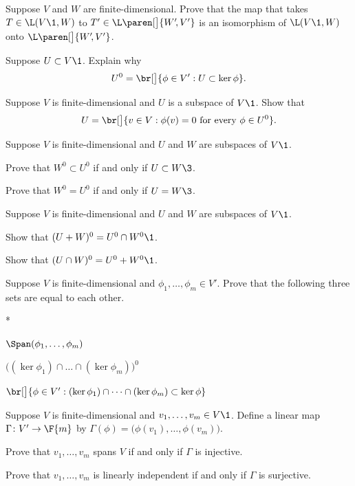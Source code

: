 \exercise
Suppose $V$ and $W$ are finite-dimensional. Prove that the map that takes $T \in \L(V\1,W)$ to $T' \in \L\paren[\big]{W'\!, V'}$ is an isomorphism of $\L(V\1,W)$ onto $\L\paren[\big]{W'\!, V'}$.


\exercise
Suppose $U \subset V\1$. Explain why
\[
U^0 = \br[\big]{\phi \in V': U \subset \ker \phi}.
\]
\exercisedisplayend


\exercise
Suppose $V$ is finite-dimensional and $U$ is a subspace of $V\1$. Show that\label{3Uan}
\[
U = \br[\big]{v \in V: \phi(v) = 0 \text{\ for every\ } \phi \in U^0}.
\]
\exercisedisplayend


\exercise
Suppose $V$ is finite-dimensional and $U$ and $W$ are subspaces of $V\1$.
\begin{subtheorem}
\item
Prove that $W^0 \subset U^0$ if and only if $U \subset W\3$.
\item
Prove that $W^0 = U^0$ if and only if $U = W\3$.
\end{subtheorem}
\exercisesubtheoremend


\exercise
Suppose $V$ is finite-dimensional and $U$ and $W$ are subspaces of $V\1$.\label{2222}
\begin{subtheorem}
\item
Show that $(U + W)^0 = U^0 \cap W^0\1$.
\item
Show that $(U \cap W)^0 = U^0 + W^0\1$.
\end{subtheorem}
\exercisesubtheoremend


\exercise
Suppose $V$ is finite-dimensional and $\phi_1, \ldots, \phi_m \in V'\!$. Prove that the following three sets are equal to each other.\label{3intersectnull}
\begin{subtheorem}*
\item
$\Span(\phi_1, \dots, \phi_m)$
\item
$\bigl( (\ker \phi_1) \cap \dots \cap (\ker \phi_m)\bigr)^0$
\item
$\br[\big]{ \phi \in V': (\ker \phi_1) \cap \dots \cap (\ker \phi_m) \subset \ker \phi }$
\end{subtheorem}
\exercisesubtheoremend


\exercise
Suppose $V$ is finite-dimensional and $v_1, \dots, v_m \in V\1$. Define a linear map $\Gamma \colon V' \to \F{m}$ by
$
\Gamma(\phi) = \bigl(\phi(v_1), \dots, \phi(v_m) \bigr)$.
\begin{subtheorem}
\item
Prove that $v_1, \dots, v_m$ spans $V$ if and only if $\Gamma$ is injective.
\item
Prove that $v_1, \dots, v_m$ is linearly independent if and only if $\Gamma$ is surjective.
\end{subtheorem}
\exercisesubtheoremend


